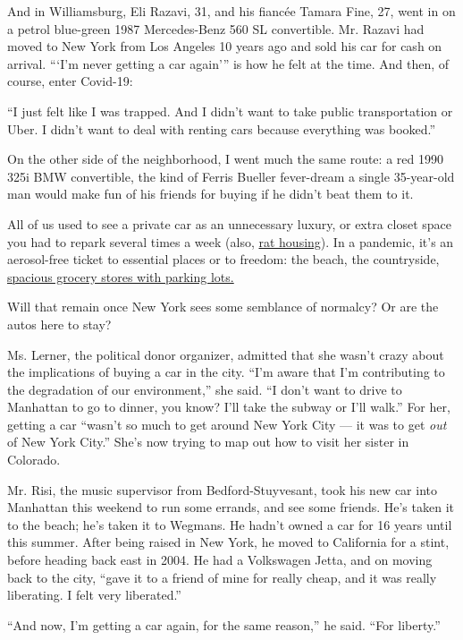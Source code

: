 And in Williamsburg, Eli Razavi, 31, and his fiancée Tamara Fine, 27,
went in on a petrol blue-green 1987 Mercedes-Benz 560 SL convertible.
Mr. Razavi had moved to New York from Los Angeles 10 years ago and sold
his car for cash on arrival. ```I'm never getting a car again''' is how
he felt at the time. And then, of course, enter Covid-19:

``I just felt like I was trapped. And I didn't want to take public
transportation or Uber. I didn't want to deal with renting cars because
everything was booked.''

On the other side of the neighborhood, I went much the same route: a red
1990 325i BMW convertible, the kind of Ferris Bueller fever-dream a
single 35-year-old man would make fun of his friends for buying if he
didn't beat them to it.

All of us used to see a private car as an unnecessary luxury, or extra
closet space you had to repark several times a week (also,
\href{https://www.nytimes3xbfgragh.onion/2020/04/30/style/rats-car-engines.html}{rat
housing}). In a pandemic, it's an aerosol-free ticket to essential
places or to freedom: the beach, the countryside,
\href{https://www.nytimes3xbfgragh.onion/2019/10/24/nyregion/wegmans-brooklyn.html}{spacious
grocery stores with parking lots.}

Will that remain once New York sees some semblance of normalcy? Or are
the autos here to stay?

Ms. Lerner, the political donor organizer, admitted that she wasn't
crazy about the implications of buying a car in the city. ``I'm aware
that I'm contributing to the degradation of our environment,'' she said.
``I don't want to drive to Manhattan to go to dinner, you know? I'll
take the subway or I'll walk.'' For her, getting a car ``wasn't so much
to get around New York City --- it was to get \emph{out} of New York
City.'' She's now trying to map out how to visit her sister in Colorado.

Mr. Risi, the music supervisor from Bedford-Stuyvesant, took his new car
into Manhattan this weekend to run some errands, and see some friends.
He's taken it to the beach; he's taken it to Wegmans. He hadn't owned a
car for 16 years until this summer. After being raised in New York, he
moved to California for a stint, before heading back east in 2004. He
had a Volkswagen Jetta, and on moving back to the city, ``gave it to a
friend of mine for really cheap, and it was really liberating. I felt
very liberated.''

``And now, I'm getting a car again, for the same reason,'' he said.
``For liberty.''

